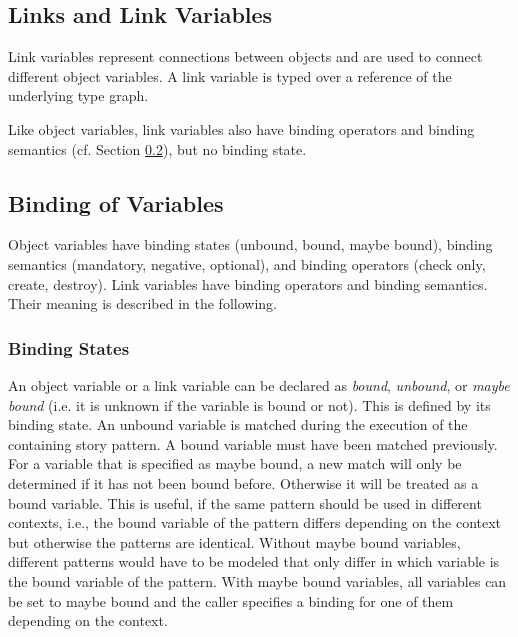 \subsection{Links and Link Variables}
\label{sec:StoryPatterns:links}

Link variables represent connections between objects and are used to connect
different object variables. A link variable is typed over a reference of the underlying
type graph.

Like object variables, link variables also have binding
operators and binding semantics (cf. Section \ref{sec:StoryPatterns:binding}), but no binding state.




\subsection{Binding of Variables}
\label{sec:StoryPatterns:binding}

Object variables have binding states (unbound, bound, maybe
bound), binding semantics (mandatory, negative, optional), and binding operators
(check only, create, destroy). Link variables have binding
operators and binding semantics.
Their meaning is described in the following. 


\subsubsection{Binding States}
\label{sec:StoryPatterns:binding:states}

An object variable or a link variable can be declared as \emph{bound}, \emph{unbound}, or
\emph{maybe bound} (i.e. it is unknown if the variable is bound or not). This is
defined by its binding state. An unbound variable is matched during the
execution of the containing story pattern. 
A bound variable must have been matched previously. 
For a variable that is specified as maybe bound, a new match will only be
determined if it has not been bound before. 
Otherwise it will be treated as a bound variable.
This is useful, if the same pattern should be used in different contexts, i.e., the bound variable of the pattern differs depending on the context but otherwise the patterns are identical.
Without maybe bound variables, different patterns would have to be modeled that only differ in which variable is the bound variable of the pattern.
With maybe bound variables, all variables can be set to maybe bound and the caller specifies a binding for one of them depending on the context.

